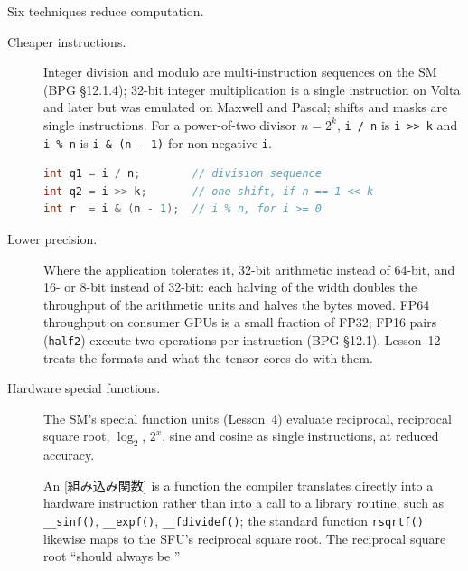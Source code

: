\documentclass[../main.tex]{subfiles}
\begin{document}
Six techniques reduce computation.
\begin{description}
  \item[Cheaper instructions.]  Integer division and modulo are
    multi-instruction sequences on the SM (BPG §12.1.4); 32-bit integer
    multiplication is a single instruction on Volta and later but was
    emulated on Maxwell and Pascal; shifts and masks are single
    instructions.  For a power-of-two divisor
    $n = 2^k$, \texttt{i / n} is \texttt{i >{}> k} and \texttt{i \% n} is
    \texttt{i \& (n - 1)} for non-negative \texttt{i}.
\begin{lstlisting}[language=C++, numbers=none]
int q1 = i / n;        // division sequence
int q2 = i >> k;       // one shift, if n == 1 << k
int r  = i & (n - 1);  // i % n, for i >= 0
\end{lstlisting}
  \item[Lower precision.]  Where the application tolerates it, 32-bit
    arithmetic instead of 64-bit, and 16- or 8-bit instead of 32-bit:
    each halving of the width doubles the throughput of the arithmetic
    units and halves the bytes moved.  FP64 throughput on consumer GPUs
    is a small fraction of FP32; FP16 pairs (\texttt{half2}) execute two
    operations per instruction (BPG §12.1).  Lesson~12 treats the formats
    and what the tensor cores do with them.
  \item[Hardware special functions.]  The SM's special function units
    (Lesson~4) evaluate reciprocal, reciprocal square root, $\log_2$,
    $2^x$, sine and cosine as single instructions, at reduced accuracy.
    \begin{definition}
      An [組み込み関数] is a function the
      compiler translates directly into a hardware instruction rather
      than into a call to a library routine, such as
      \texttt{\_\_sinf()}, \texttt{\_\_expf()}, \texttt{\_\_fdividef()};
      the standard function \texttt{rsqrtf()} likewise maps to the
      SFU's reciprocal square root.  The reciprocal square root \enquote{should always be
}
\end{definition}
\end{description}
\end{document}
